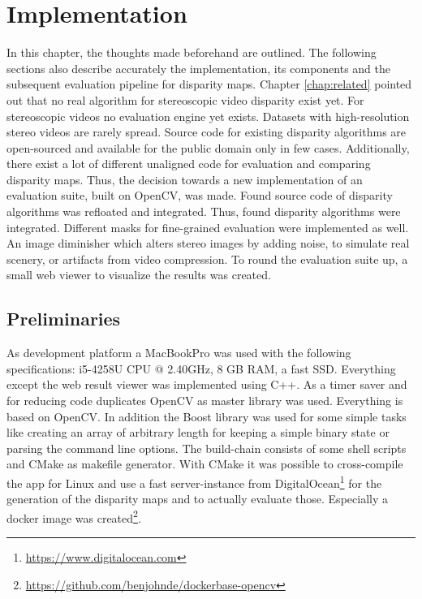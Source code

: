 \chapter{Implementation}
\label{chap:impl}

In this chapter, the thoughts made beforehand are outlined.
The following sections also describe accurately the implementation, its components and the subsequent evaluation pipeline for disparity maps.
Chapter \ref{chap:related} pointed out that no real algorithm for stereoscopic video disparity exist yet.
For stereoscopic videos no evaluation engine yet exists.
Datasets with high-resolution stereo videos are rarely spread.
Source code for existing disparity algorithms are open-sourced and available for the public domain only in few cases.
Additionally, there exist a lot of different unaligned code for evaluation and comparing disparity maps.
Thus, the decision towards a new implementation of an evaluation suite, built on OpenCV, was made.
Found source code of disparity algorithms was refloated and integrated.
Thus, found disparity algorithms were integrated.
Different masks for fine-grained evaluation were implemented as well.
An image diminisher which alters stereo images by adding noise, to simulate real scenery, or artifacts from video compression.
To round the evaluation suite up, a small web viewer to visualize the results was created.

\section{Preliminaries}

As development platform a MacBookPro was used with the following specifications: i5-4258U CPU @ 2.40GHz, 8 GB RAM, a fast SSD.
Everything except the web result viewer was implemented using C++.
As a timer saver and for reducing code duplicates OpenCV as master library was used.
Everything is based on OpenCV.
In addition the Boost library was used for some simple tasks like creating an array of arbitrary length for keeping a simple binary state or parsing the command line options.
The build-chain consists of some shell scripts and CMake as makefile generator.
With CMake it was possible to cross-compile the app for Linux and use a fast server-instance from DigitalOcean\footnote{\url{https://www.digitalocean.com}} for the generation of the disparity maps and to actually evaluate those.
\noindent Especially a docker image was created\footnote{\url{https://github.com/benjohnde/dockerbase-opencv}}.

